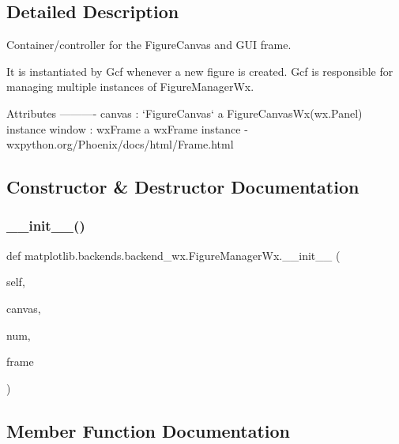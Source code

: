 \subsection{Detailed Description}
\begin{DoxyVerb}Container/controller for the FigureCanvas and GUI frame.

It is instantiated by Gcf whenever a new figure is created.  Gcf is
responsible for managing multiple instances of FigureManagerWx.

Attributes
----------
canvas : `FigureCanvas`
    a FigureCanvasWx(wx.Panel) instance
window : wxFrame
    a wxFrame instance - wxpython.org/Phoenix/docs/html/Frame.html
\end{DoxyVerb}
 

\subsection{Constructor \& Destructor Documentation}
\mbox{\label{classmatplotlib_1_1backends_1_1backend__wx_1_1FigureManagerWx_a9099efe4348a0370ef6a3c3386316dd4}} 
\subsubsection{\texorpdfstring{\+\_\+\+\_\+init\+\_\+\+\_\+()}{\_\_init\_\_()}}
{\footnotesize\ttfamily def matplotlib.\+backends.\+backend\+\_\+wx.\+Figure\+Manager\+Wx.\+\_\+\+\_\+init\+\_\+\+\_\+ (\begin{DoxyParamCaption}\item[{}]{self,  }\item[{}]{canvas,  }\item[{}]{num,  }\item[{}]{frame }\end{DoxyParamCaption})}



\subsection{Member Function Documentation}
\mbox{\label{classmatplotlib_1_1backends_1_1backend__wx_1_1FigureManagerWx_a6f070b117235bdeb0671bd7e2bb36a07}} 
